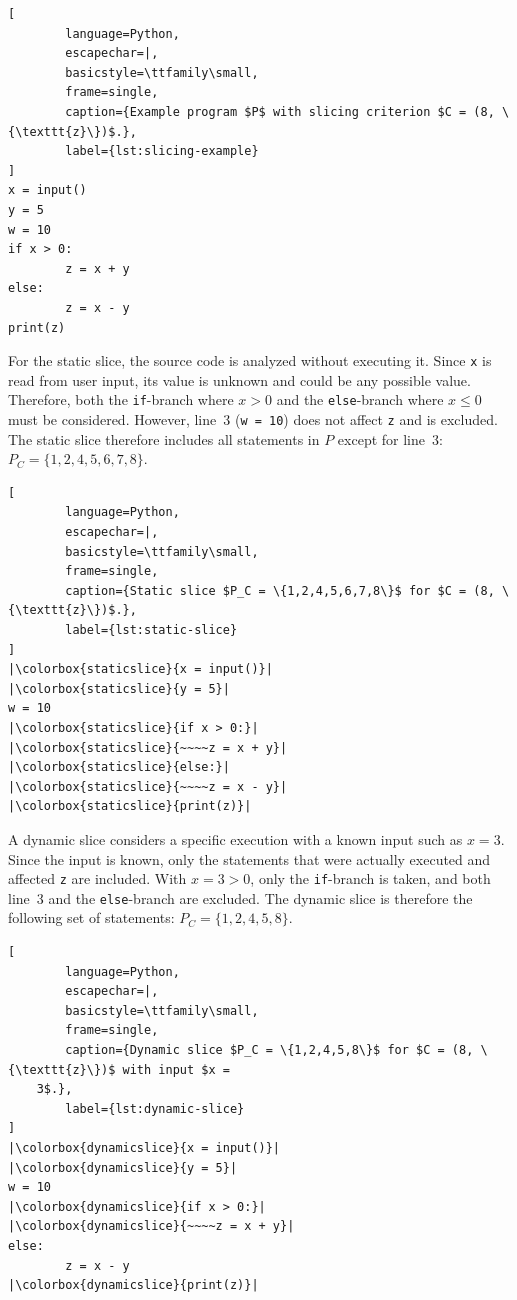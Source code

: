 \documentclass[
12pt,
fancyheadings,
a4paper,
twoside,
BCOR=0.7cm,
nobcorignoretitle,
grayscalebody,
]{stsreprt}
\begin{document}
\begin{lstlisting}[
        language=Python,
        escapechar=|,
        basicstyle=\ttfamily\small,
        frame=single,
        caption={Example program $P$ with slicing criterion $C = (8, \{\texttt{z}\})$.},
        label={lst:slicing-example}
]
x = input()
y = 5
w = 10
if x > 0:
        z = x + y
else:
        z = x - y
print(z)
\end{lstlisting}

For the static slice, the source code is analyzed without executing it.
Since \texttt{x} is read from user input, its value is unknown and could be any possible value.
Therefore, both the \texttt{if}-branch where $x > 0$ and the \texttt{else}-branch where $x \leq 0$
must be considered.
However, line~3 (\texttt{w~=~10}) does not affect \texttt{z} and is excluded.
The static slice therefore includes all statements in $P$ except for line~3: $P_C =
\{1,2,4,5,6,7,8\}$.

\begin{lstlisting}[
        language=Python,
        escapechar=|,
        basicstyle=\ttfamily\small,
        frame=single,
        caption={Static slice $P_C = \{1,2,4,5,6,7,8\}$ for $C = (8, \{\texttt{z}\})$.},
        label={lst:static-slice}
]
|\colorbox{staticslice}{x = input()}|
|\colorbox{staticslice}{y = 5}|
w = 10
|\colorbox{staticslice}{if x > 0:}|
|\colorbox{staticslice}{~~~~z = x + y}|
|\colorbox{staticslice}{else:}|
|\colorbox{staticslice}{~~~~z = x - y}|
|\colorbox{staticslice}{print(z)}|
\end{lstlisting}

A dynamic slice considers a specific execution with a known input such as $x = 3$.
Since the input is known, only the statements that were actually executed and affected \texttt{z}
are included.
With $x = 3 > 0$, only the \texttt{if}-branch is taken, and both line~3 and the
\texttt{else}-branch are excluded.
The dynamic slice is therefore the following set of statements: $P_C = \{1,2,4,5,8\}$.

\begin{lstlisting}[
        language=Python,
        escapechar=|,
        basicstyle=\ttfamily\small,
        frame=single,
        caption={Dynamic slice $P_C = \{1,2,4,5,8\}$ for $C = (8, \{\texttt{z}\})$ with input $x =
    3$.},
        label={lst:dynamic-slice}
]
|\colorbox{dynamicslice}{x = input()}|
|\colorbox{dynamicslice}{y = 5}|
w = 10
|\colorbox{dynamicslice}{if x > 0:}|
|\colorbox{dynamicslice}{~~~~z = x + y}|
else:
        z = x - y
|\colorbox{dynamicslice}{print(z)}|
\end{lstlisting}
\end{document}
